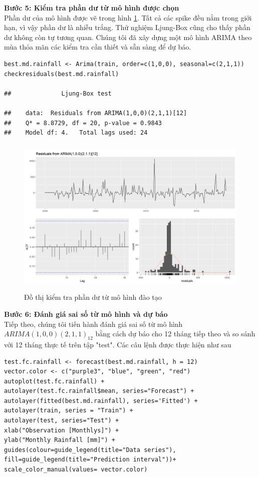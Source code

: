 \documentclass[12pt, a4paper,oneside]{book}
\theoremstyle{definition}
\begin{document}
\textbf{Bước 5: Kiểm tra phần dư từ mô hình được chọn}\\
Phần dư của mô hình được vẽ trong hình \ref{V7}. Tất cả các spike đều nằm trong giới hạn, vì vậy phần dư là nhiễu trắng. Thử nghiệm Ljung-Box cũng cho thấy phần dư không còn tự tương quan. Chúng tôi đã xây dựng một mô hình ARIMA theo mùa thỏa mãn các kiểm tra cần thiết và sẵn sàng để dự báo.\\
\begin{lstlisting}
best.md.rainfall <- Arima(train, order=c(1,0,0), seasonal=c(2,1,1))
checkresiduals(best.md.rainfall)

##          	Ljung-Box test

##    data:  Residuals from ARIMA(1,0,0)(2,1,1)[12]
##    Q* = 8.8729, df = 20, p-value = 0.9843
##    Model df: 4.   Total lags used: 24
\end{lstlisting}
\begin{figure}[!htb]
	\centering
	\includegraphics[width=1\linewidth,height=7.7cm]{anh/V7}
	\vskip-4mm 
	\caption{Đồ thị kiểm tra phần dư từ mô hình đào tạo}  
	\label{V7}
\end{figure}
\textbf{Bước 6: Đánh giá sai số từ mô hình và dự báo}\\
Tiếp theo, chúng tôi tiến hành đánh giá sai số từ mô hình $ARIMA(1,0,0)(2,1,1)_{12}$ bằng cách dự báo cho 12 tháng tiếp theo và so sánh với 12 tháng thực tế trên tập "test". Các câu lệnh được thực hiện như sau
\begin{lstlisting}
test.fc.rainfall <- forecast(best.md.rainfall, h = 12) 
vector.color <- c("purple3", "blue", "green", "red")
autoplot(test.fc.rainfall) +
autolayer(test.fc.rainfall$mean, series="Forecast") +
autolayer(fitted(best.md.rainfall), series='Fitted') + 
autolayer(train, series = "Train") +
autolayer(test, series="Test") + 
xlab("Observation [Monthlys]") +
ylab("Monthly Rainfall [mm]") +
guides(colour=guide_legend(title="Data series"), 
fill=guide_legend(title="Prediction interval"))+
scale_color_manual(values= vector.color)
\end{lstlisting}
\end{document}
